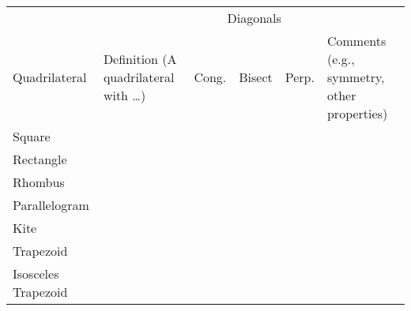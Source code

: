 \documentclass{ximera}
\begin{document}
\newpage 

{
\renewcommand\arraystretch{2.8}
\renewcommand\tabcolsep{12pt}
\begin{table}[h]
\begin{tabular}{|l|p{6cm}|c|c|c|p{8cm}|}
\hline 
 &   & \multicolumn{3}{c|}{Diagonals} &  \\  %
Quadrilateral & Definition (A quadrilateral with \dots) & \begin{sideways}Cong.\end{sideways} & 
\begin{sideways}Bisect\end{sideways} & \begin{sideways}Perp.\end{sideways} & Comments (e.g., symmetry, other properties) \\ \hline\hline
Square           &            &   &  &         &                  \\  \hline
Rectangle       &           &   &  &         &                  \\ \hline
Rhombus        &           &   &  &         &                  \\ \hline
Parallelogram &           &   &  &         &                  \\ \hline
Kite                &           &   &  &          &                  \\ \hline
Trapezoid       &           &   &  &         &                  \\ \hline
Isosceles Trapezoid       &           &   &  &         &                  \\ \hline
\end{tabular}
\end{table}
}
\end{document}
